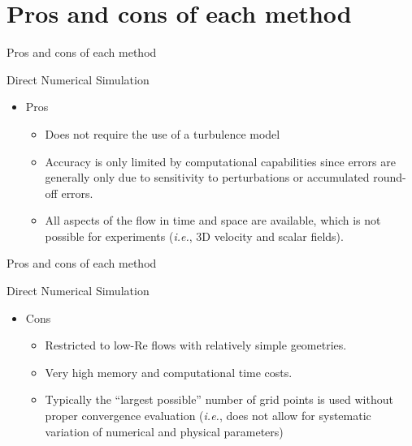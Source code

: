 \section{Pros and cons of each method} %
\begin{frame}{Pros and cons of each method}

Direct Numerical Simulation
\begin{itemize}
	\item Pros
	\begin{itemize}
		\item Does not require the use of a turbulence model
		\item Accuracy is only limited by computational capabilities since errors are generally only due to sensitivity to perturbations or accumulated round-off errors.
		\item All aspects of the flow in time and space are available, which is not possible for experiments (\textit{i.e.}, 3D velocity and scalar fields).
	\end{itemize}

\end{itemize}
\end{frame}

\begin{frame}{Pros and cons of each method}

Direct Numerical Simulation
\begin{itemize}
	\item Cons
	\begin{itemize}
		\item Restricted to low-Re flows with relatively simple geometries.
		\item Very high memory and computational time costs.
		\item Typically the ``largest possible'' number of grid points is used without proper convergence evaluation (\textit{i.e.}, does not allow for systematic variation of numerical and physical parameters)
	\end{itemize}
\end{itemize}
\end{frame}



